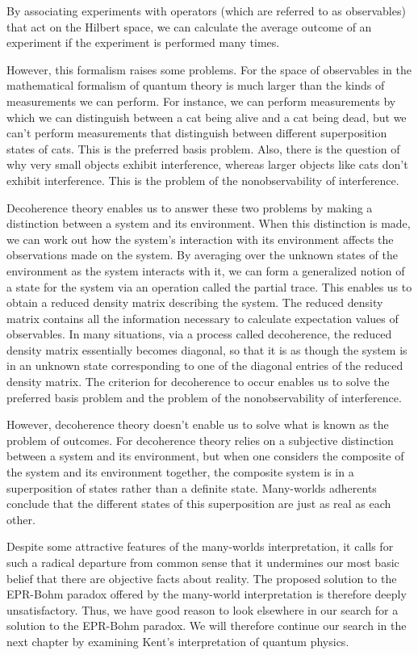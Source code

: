 \documentclass[12pt]{report}
\begin{document}
By associating experiments with operators (which are referred to as observables) that act on the Hilbert space, we can calculate the average outcome of an experiment if the experiment is performed many times. 

However, this formalism raises some problems. For the space of observables in the mathematical formalism of quantum theory is much larger than the kinds of measurements we can perform. For instance, we can perform measurements by which we can distinguish between a cat being alive and a cat being dead, but we can't perform measurements that distinguish between different superposition states of cats. This is the preferred basis problem. Also, there is the question of why very small objects exhibit interference, whereas larger objects like cats don't exhibit interference. This is the problem of the nonobservability of interference. 

Decoherence theory enables us to answer these two problems by making a distinction between a system and its environment. When this distinction is made, we can work out how the system's interaction with its environment affects the observations made on the system. By averaging over the unknown states of the environment as the system interacts with it, we can form a generalized notion of a state for the system via an operation called the partial trace. This enables us to obtain a reduced density matrix describing the system. The reduced density matrix contains all the information necessary to calculate expectation values of observables. In many situations, via a process called decoherence, the reduced density matrix essentially becomes diagonal, so that it is as though the system is in an unknown state corresponding to one of the diagonal entries of the  reduced density matrix. The criterion for decoherence to occur enables us to solve the preferred basis problem and the problem of the nonobservability of interference.

However, decoherence theory doesn't enable us to solve what is known as the problem of outcomes. For decoherence theory relies on a subjective distinction between a system and its environment, but when one considers the composite of the system and its environment together, the composite system is in a superposition of states rather than a definite state. Many-worlds adherents conclude that the different states of this superposition are just as real as each other. 

Despite some attractive features of the many-worlds interpretation, it calls for such a radical departure from common sense that it undermines our most basic belief that there are objective facts about reality. The proposed solution to the EPR-Bohm paradox offered by the many-world interpretation is therefore deeply unsatisfactory. Thus, we have good reason  to look elsewhere in our search for a solution to the EPR-Bohm paradox. We will therefore continue our search in the next chapter by examining Kent's interpretation of quantum physics. 
\end{document}

